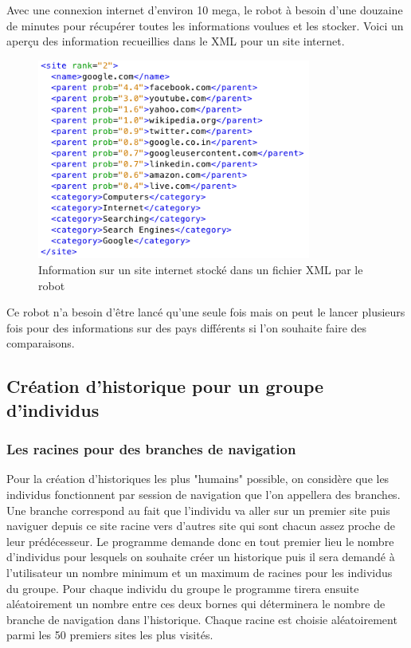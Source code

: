 \documentclass[a4paper, 11pt]{article}
\begin{document}
Avec une connexion internet d'environ 10 mega, le robot à besoin d'une douzaine de minutes pour récupérer toutes les informations voulues et les stocker. Voici un aperçu des information recueillies dans le XML pour un site internet.

\begin{figure}[h!]
\center
\includegraphics[width=9cm]{images/infoSiteXML.png}
\caption{Information sur un site internet stocké dans un fichier XML par le robot}
\end{figure}

Ce robot n'a besoin d'être lancé qu'une seule fois mais on peut le lancer plusieurs fois pour des informations sur des pays différents si l'on souhaite faire des comparaisons.


\subsection{Création d'historique pour un groupe d'individus}
\subsubsection{Les racines pour des branches de navigation}
Pour la création d'historiques les plus "humains" possible, on considère que les individus fonctionnent par session de navigation que l'on appellera des branches. Une branche correspond au fait que l'individu va aller sur un premier site puis naviguer depuis ce site racine vers d'autres site qui sont chacun assez proche de leur prédécesseur. Le programme demande donc en tout premier lieu le nombre d'individus pour lesquels on souhaite créer un historique puis il sera demandé à l'utilisateur un nombre minimum et un maximum de racines pour les individus du groupe. Pour chaque individu du groupe le programme tirera ensuite aléatoirement un nombre entre ces deux bornes qui déterminera le nombre de branche de navigation dans l'historique.
Chaque racine est choisie aléatoirement parmi les 50 premiers sites les plus visités.
\end{document}
